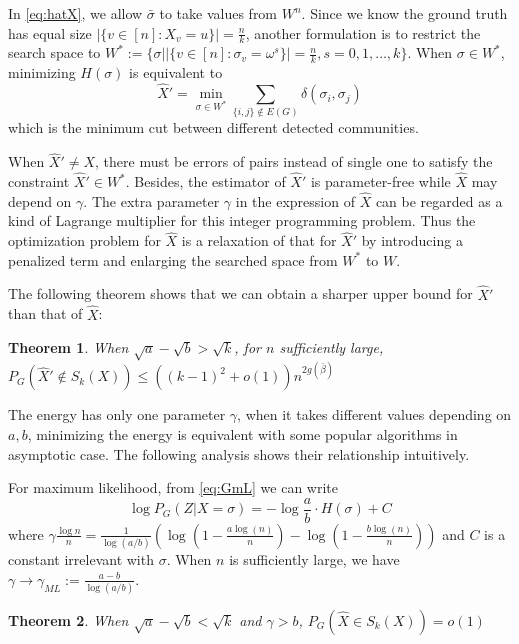 \documentclass[journal]{IEEEtran}
\newtheorem{theorem}{Theorem}
\newcommand{\A}{\frac{a \log(n)}{n}}
\newcommand{\B}{\frac{b \log(n)}{n}}
\newcommand{\1}{\mathbbm{1}}
\begin{document}
In \eqref{eq:hatX}, we allow $\bar{\sigma}$ to take values from $W^n$. Since we know the ground truth has equal
size $|\{v \in [n] : X_v = u\}| = \frac{n}{k}$, another formulation is to restrict the search space to
$W^*:= \{\sigma \big\vert |\{v \in [n] : \sigma_v = \omega^s\}| = \frac{n}{k}, s=0,1, \dots, k \}$.
When $\sigma \in W^*$, minimizing $H(\sigma)$ is equivalent to
\begin{equation}
\hat{X}' = \min_{\sigma \in W^*} \sum_{\{i,j\} \not\in E(G) } \delta(\sigma_i, \sigma_j)
\end{equation}
which is the minimum cut between different detected communities.

When $\hat{X}' \neq X$, there must be errors of pairs instead of single one to satisfy the constraint $\hat{X}' \in W^*$.
Besides, the estimator of $\hat{X}'$ is parameter-free while $\hat{X}$ may depend on $\gamma$. The extra parameter $\gamma$ in the expression of
$\hat{X}$ can be regarded as a kind of Lagrange multiplier for this integer programming problem. Thus the optimization problem for $\hat{X}$
is a relaxation of that for $\hat{X}'$ by introducing a penalized term and enlarging the searched space from $W^*$ to $W$.

The following theorem shows that we can obtain a sharper upper bound for $\hat{X}'$ than that of $\hat{X}$:
\begin{theorem}\label{thm:error_rate_2}
	When $\sqrt{a} - \sqrt{b} > \sqrt{k}$, for $n$ sufficiently large, $P_G(\hat{X}' \not\in S_k(X)) \leq ((k-1)^2+o(1))n^{2g(\bar{\beta})}$
\end{theorem}
 
The energy has only one parameter $\gamma$, when it takes different values depending on $a,b$, minimizing the
energy is equivalent with some popular algorithms in asymptotic case. The following analysis shows
their relationship intuitively.

For maximum likelihood, from \eqref{eq:GmL} we can write
$$
\log P_G(Z|X=\sigma) = -\log\frac{a}{b} \cdot H(\sigma) + C
$$
where $\gamma \frac{\log n}{n} = \frac{1}{\log(a/b)}(\log (1-\A) - \log (1-\B))$ and $C$ is a constant irrelevant with $\sigma$.
When $n$ is sufficiently large, we have $\gamma \to \gamma_{ML} := \frac{a-b}{\log(a/b)}$.


\begin{theorem}
	When $\sqrt{a} - \sqrt{b} < \sqrt{k}$ and $\gamma > b$, $P_G(\hat{X} \in S_k(X)) = o(1)$
\end{theorem}
\end{document}
